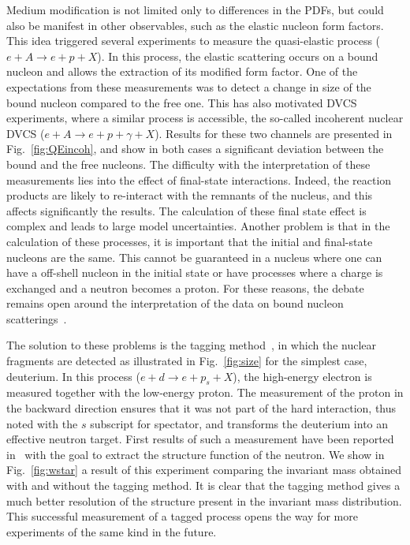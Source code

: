 Medium modification is not limited only to differences in the PDFs,
but could also be manifest in other observables, such as the elastic nucleon form factors.
This idea
triggered several experiments to measure the quasi-elastic 
process ($e+A \rightarrow e+p+X$). In this process, the 
elastic scattering occurs on a bound nucleon and allows the extraction of its modified 
form factor. One of the expectations from these measurements was to detect a change
in size of the bound nucleon compared to the free one. This has also motivated 
DVCS experiments, where a similar process is accessible, the so-called
incoherent nuclear DVCS ($e+A \rightarrow e+p+\gamma+X$). Results for these two 
channels are presented in Fig.~\ref{fig:QEincoh}, and show in both cases a 
significant deviation between the bound and the free nucleons. 
The difficulty with the interpretation of these measurements lies into the 
effect of final-state interactions. Indeed, the reaction products are likely
to re-interact with the remnants of the nucleus, and this affects significantly the
results. The calculation of these final state effect is complex and leads to large model 
uncertainties. 
Another problem is that in the calculation of these processes, it is important
that the initial and final-state nucleons are the same. This cannot be guaranteed
in a nucleus where one can have a off-shell nucleon in the initial state or 
have processes where a charge is exchanged and a neutron becomes a proton. For
these reasons, the debate remains open around 
the interpretation of the data on bound nucleon scatterings~\cite{Benhar:2006wy}.


The solution to these problems is the tagging method~\cite{CiofidegliAtti:1999kp}, in which the nuclear fragments
are detected as illustrated in Fig.~\ref{fig:size} for the simplest case, deuterium.
In this process ($e+d \rightarrow e+p_s+X$), the high-energy electron is measured
together with the low-energy proton. The measurement of the proton in the backward 
direction ensures that it was not part of the hard interaction, thus noted with 
the $s$ subscript for spectator, and transforms the deuterium into 
an effective neutron target. First results of such a measurement
have been reported in~\cite{Baillie:2011za} with the goal to extract the structure
function of the neutron. We show in Fig.~\ref{fig:wstar} a result of this experiment
comparing the invariant mass obtained with and without the tagging method. It is 
clear that the tagging method gives a much better resolution of the structure 
present in the invariant mass distribution. This successful measurement of a tagged process opens the way for more
experiments of the same kind in the future. 


